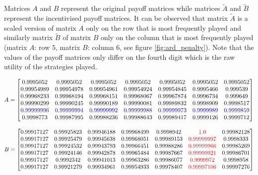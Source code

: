 Matrices \(A\) and \(B\) represent the original payoff matrices while matrices
\(\tilde{A}\) and \(\tilde{B}\) represent the incentivised payoff matrices.
It can be observed that matrix \(\tilde{A}\) is a scaled version of matrix 
\(A\) only on the row that is most frequently played and similarly matrix 
\(\tilde{B}\) of matrix \(B\) only on the column that is most frequently played
(matrix \(A\): row \(5\), matrix \(B\): column \(6\), see figure 
\ref{fig:ard_penalty}).
Note that the values of the payoff matrices only differ on the fourth digit
which is the raw utility of the strategies played.

\tiny
\begin{equation*}
    A = 
    \begin{bmatrix}
        0.9995052 & 0.9995052 & 0.9995052 & 0.9995052 & 0.9995052 
        & 0.9995052 & 0.9995052 \\
        0.99954989 & 0.99954978 & 0.99954961 & 0.99954924 & 0.99954845 
        & 0.9995466 & 0.999539 \\
        0.99968233 & 0.99968194 & 0.99968151 & 0.99968067 & 0.99967874 
        & 0.9996734 & 0.999649  \\
        0.99990299 & 0.99990245 & 0.99990189 & 0.99990081 & 0.99989832
        & 0.9998909 & 0.9998517 \\
        \color{blue}0.99999996 & \color{blue}0.99999994 & \color{blue}0.99999992 
        & \color{blue}0.99999988 & \color{blue}0.99999973 & \color{blue}0.9999989 
        & \color{blue}0.9999859 \\
        0.9998773 & 0.99987995 & 0.99988236 & 0.99988643 & 0.99989417 
        & 0.9999126 & 0.9999712
    \end{bmatrix}
\end{equation*}

\begin{equation*}
    B = 
    \begin{bmatrix}
        0.99917127 & 0.99925823 & 0.99946188 & 0.99968499 & 0.9998942 
        & \color{red}1.0 & 0.99982128 \\
        0.99917127 & 0.99925479 & 0.99945638 & 0.99968051 & 0.99989153 
        & \color{red}0.99999997 & 0.9998333  \\
        0.99917127 & 0.99924532 & 0.99943793 & 0.99966451 & 0.99988286 
        & \color{red}0.99999966 & 0.99985269 \\
        0.99917127 & 0.99924146 & 0.99942878 & 0.99965484 & 0.99987667 
        & \color{red}0.99999921 & 0.99986701 \\
        0.99917127 & 0.9992342 &  0.99941013 & 0.99963286 & 0.99986077 
        & \color{red}0.9999972 & 0.9998958  \\
        0.99917127 & 0.99921279 & 0.99934961 & 0.99954933 & 0.99978407 
        & \color{red}0.99997106 & 0.99997276 \\
    \end{bmatrix}
\end{equation*}

